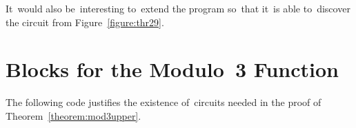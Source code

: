 It~would also be~interesting to~extend the program
so~that it~is able to~discover the circuit from Figure~\ref{figure:thr29}.



\appendix
\section{Blocks for the Modulo~3 Function}
The following code justifies the existence of~circuits needed in the proof of Theorem~\ref{theorem:mod3upper}.
\inputminted{python}{mod3_check.py}

